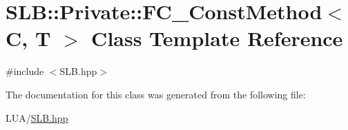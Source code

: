\hypertarget{classSLB_1_1Private_1_1FC__ConstMethod}{}\section{S\+LB\+:\+:Private\+:\+:F\+C\+\_\+\+Const\+Method$<$ C, T $>$ Class Template Reference}
\label{classSLB_1_1Private_1_1FC__ConstMethod}


{\ttfamily \#include $<$S\+L\+B.\+hpp$>$}



The documentation for this class was generated from the following file\+:\begin{DoxyCompactItemize}
\item 
L\+U\+A/\hyperlink{SLB_8hpp}{S\+L\+B.\+hpp}\end{DoxyCompactItemize}
